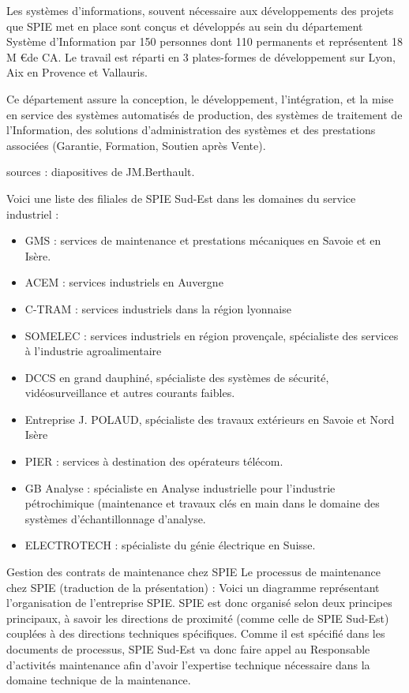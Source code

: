 Les systèmes d’informations, souvent nécessaire aux développements des projets que SPIE met en place sont conçus et développés au sein du département Système d’Information par 150 personnes dont 110 permanents et représentent 18 M \euro de CA. Le travail est réparti en 3 plates-formes de développement sur Lyon, Aix en Provence et Vallauris.

Ce département assure la conception, le développement, l’intégration, et la mise en service des systèmes automatisés de production, des systèmes de traitement de l’Information, des solutions d’administration des systèmes et des prestations associées (Garantie, Formation, Soutien après Vente).

sources : diapositives de JM.Berthault.

Voici une liste des filiales de SPIE Sud-Est dans les domaines du service industriel :

\begin{itemize}
\item GMS : services de maintenance et prestations mécaniques en Savoie et en Isère.
\item ACEM : services industriels en Auvergne
\item C-TRAM : services industriels dans la région lyonnaise
\item SOMELEC : services industriels en région provençale, spécialiste des services à l’industrie agroalimentaire
\item DCCS en grand dauphiné, spécialiste des systèmes de sécurité, vidéosurveillance et autres courants faibles.
\item Entreprise J. POLAUD, spécialiste des travaux extérieurs en Savoie et Nord Isère
\item PIER : services à destination des opérateurs télécom.
\item GB Analyse : spécialiste en Analyse industrielle pour l’industrie pétrochimique (maintenance et travaux clés en main dans le domaine des systèmes d’échantillonnage d’analyse.
\item ELECTROTECH : spécialiste du génie électrique en Suisse.
\end{itemize}


Gestion des contrats de maintenance chez SPIE
Le processus de maintenance chez SPIE (traduction de la présentation) :
Voici un diagramme représentant l'organisation de l'entreprise SPIE. SPIE est donc organisé selon deux principes principaux, à savoir les directions de proximité (comme celle de SPIE Sud-Est) couplées à des directions techniques spécifiques. Comme il est spécifié dans les documents de processus, SPIE Sud-Est va donc faire appel au Responsable d'activités maintenance afin d'avoir l'expertise technique nécessaire dans la domaine technique de la maintenance.

